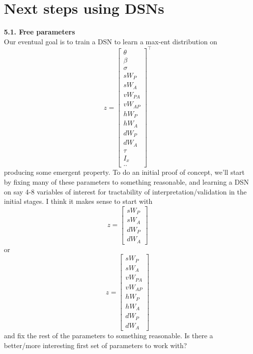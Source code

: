 \documentclass[11pt]{article}
\begin{document}
\section{Next steps using DSNs}
\textbf{5.1. Free parameters} \\
Our eventual goal is to train a DSN to learn a max-ent distribution on 
\begin{equation}
z = \begin{bmatrix} \theta \\ \beta \\ \sigma \\ sW_P \\ sW_A \\ vW_{PA} \\ vW_{AP} \\ hW_P \\ hW_A \\ dW_P \\ dW_A \\ \tau \\ I_x \\ .. \end{bmatrix}^{\top}
\end{equation}
producing some emergent property.  To do an initial proof of concept, we'll start by fixing many of these parameters to something reasonable, and learning a DSN on say 4-8 variables of interest for tractability of interpretation/validation in the initial stages.  I think it makes sense to start with
\begin{equation}
z = \begin{bmatrix} sW_P \\ sW_A \\ dW_P \\ dW_A \end{bmatrix}
\end{equation}
or
\begin{equation}
z = \begin{bmatrix} sW_P \\ sW_A \\ vW_{PA} \\ vW_{AP} \\ hW_P \\ hW_A \\ dW_P \\ dW_A  \end{bmatrix}
\end{equation}
and fix the rest of the parameters to something reasonable.  Is there a better/more interesting first set of parameters to work with?
\end{document}
